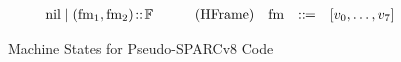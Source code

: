 \begin{figure*}[!t]
\[\begin{array}{rcclrcclrccl}
            \text{nil} \; | \; (\text{fm}_1, \text{fm}_2) \!::\! \mathbb{F}
            & \qquad
            \text{(HFrame)} & \text{fm} & ::\!\!{=} & 
            [v_0, \dots, v_7]
        \end{array}
    \]
    \vspace{-1em}
    \caption{Machine States for Pseudo-SPARCv8 Code}
    \label{fig:machine-state-concur-pseudo-sparc}
    \vspace{-0.5em}
\end{figure*}

